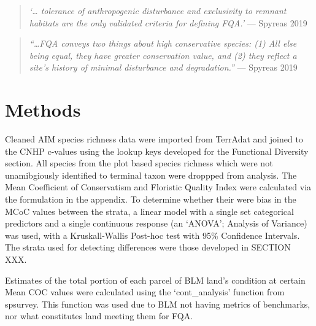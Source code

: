 \documentclass[
]{article}
\begin{document}
\begin{quote}
\emph{`\ldots{} tolerance of anthropogenic disturbance and exclusivity
to remnant habitats are the only validated criteria for deﬁning FQA.'}
\hfill --- Spyreas 2019
\end{quote}

\begin{quote}
\emph{``\ldots FQA conveys two things about high conservative species:
(1) All else being equal, they have greater conservation value, and (2)
they reﬂect a site's history of minimal disturbance and degradation.''}
\hfill --- Spyreas 2019
\end{quote}

\hypertarget{methods}{%
\section{Methods}\label{methods}}

Cleaned AIM species richness data were imported from TerrAdat and joined
to the CNHP c-values using the lookup keys developed for the Functional
Diversity section. All species from the plot based species richness
which were not unamibgiously identified to terminal taxon were droppped
from analysis. The Mean Coefficient of Conservatism and Floristic
Quality Index were calculated via the formulation in the appendix. To
determine whether their were bias in the MCoC values between the strata,
a linear model with a single set categorical predictors and a single
continuous response (an `ANOVA'; Analysis of Variance) was used, with a
Kruskall-Wallis Post-hoc test with 95\% Confidence Intervals. The strata
used for detecting differences were those developed in SECTION XXX.

Estimates of the total portion of each parcel of BLM land's condition at
certain Mean COC values were calculated using the `cont\_analysis'
function from spsurvey. This function was used due to BLM not having
metrics of benchmarks, nor what constitutes land meeting them for FQA.
\end{document}
